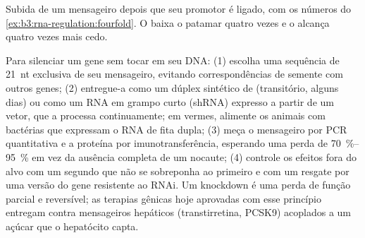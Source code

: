 \begin{omfigure}

{\small Subida de um mensageiro depois que seu promotor é ligado, com
os números do \cref{ex:b3:rna-regulation:fourfold}. O  baixa o
patamar quatro vezes e o alcança quatro vezes mais cedo.}
\end{omfigure}

\begin{method}\label{met:b3:rna-regulation:knockdown}
Para silenciar um gene sem tocar em seu DNA: (1) escolha uma sequência
de \qty{21}{nt} exclusiva de seu mensageiro, evitando correspondências
de semente com outros genes; (2) entregue-a como um dúplex sintético
de  (transitório, alguns dias) ou como um RNA em grampo curto
(shRNA) expresso a partir de um vetor, que a  processa
continuamente; em vermes, alimente os animais com bactérias que
expressam o RNA de fita dupla; (3) meça o mensageiro por PCR
quantitativa e a proteína por imunotransferência, esperando uma perda
de \qtyrange{70}{95}{\%} em vez da ausência completa de um nocaute;
(4) controle os efeitos fora do alvo com um segundo  que não se
sobreponha ao primeiro e com um resgate por uma versão do gene
resistente ao RNAi. Um knockdown é uma perda de função parcial e
reversível; as terapias gênicas hoje aprovadas com esse princípio
entregam  contra mensageiros hepáticos (transtirretina, PCSK9)
acoplados a um açúcar que o hepatócito capta.
\end{method}

